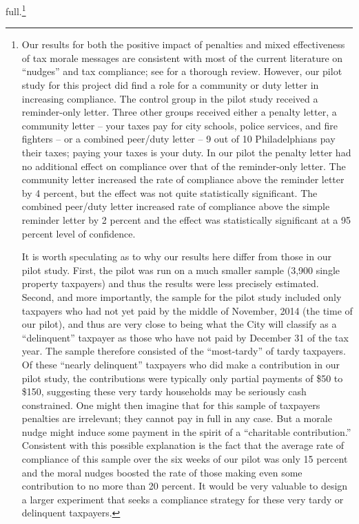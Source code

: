 \documentclass[12pt]{article}
\begin{document}
full.\footnote{\label{fn:nudges}Our results for both the positive
  impact of penalties and mixed effectiveness of tax morale messages
  are consistent with most of the current literature on ``nudges'' and
  tax compliance; see \cite{Hallsworth-14} for a thorough review. However, our pilot study
  \cite{CILMS-16} for this project did find a role for a community or
  duty letter in increasing compliance.  The control group in the
  pilot study received a reminder-only letter.  Three other groups
  received either a penalty letter, a community letter -- your taxes
  pay for city schools, police services, and fire fighters -- or a
  combined peer/duty letter -- 9 out of 10 Philadelphians pay their
  taxes; paying your taxes is your duty. In our pilot the penalty
  letter had no additional effect on compliance over that of the
  reminder-only letter.  The community letter increased the rate of
  compliance above the reminder letter by 4 percent, but the effect
  was not quite statistically significant.  The combined peer/duty
  letter increased rate of compliance above the simple reminder letter
  by 2 percent and the effect was statistically significant at a 95
  percent level of confidence.

It is worth speculating as to why our results here differ from those
in our pilot study.  First, the pilot was run on a much smaller sample
(3,900 single property taxpayers) and thus the results were less
precisely estimated.  Second, and more importantly, the sample for the
pilot study included only taxpayers who had not yet paid by the middle of
November, 2014 (the time of our pilot), and thus are very close to
being what the City will classify as a ``delinquent'' taxpayer as
those who have not paid by December 31 of the tax year.  The sample
therefore consisted of the ``most-tardy'' of tardy taxpayers.  Of
these ``nearly delinquent'' taxpayers who did make a contribution in our
pilot study, the contributions were typically only partial payments of
\$50 to \$150, suggesting these very tardy households may be seriously cash
constrained.  One might then imagine that for this sample of taxpayers penalties are irrelevant; they cannot pay in full in any case.
But a morale nudge might induce some payment in the spirit of a
``charitable contribution.''  Consistent with this possible
explanation is the fact that the average rate of compliance of this
sample over the six weeks of our pilot was only 15 percent and the
moral nudges boosted the rate of those making even some contribution
to no more than 20 percent.  It would be very valuable to design a
larger experiment that seeks a compliance strategy for these very
tardy or delinquent taxpayers.}
\end{document}
